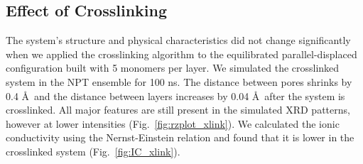 \documentclass{article}
\newcommand{\angstrom}{\textup{\AA}}
\begin{document}
  \subsection{Effect of Crosslinking}\label{section:xlink}

  The system's structure and physical characteristics did not change
  significantly when we applied the crosslinking algorithm to the equilibrated
  parallel-displaced configuration built with 5 monomers per layer. We simulated
  the crosslinked system in the NPT ensemble for 100 ns. The distance between
  pores shrinks by 0.4 \angstrom~and the distance between layers increases by
  0.04 \AA~after the system is crosslinked. All major features are still present
  in the simulated XRD patterns, however at lower intensities
  (Fig.~\ref{fig:rzplot_xlink}). We calculated the ionic conductivity using the
  Nernst-Einstein relation and found that it is lower in the crosslinked system
  (Fig.~\ref{fig:IC_xlink}).
\end{document}
